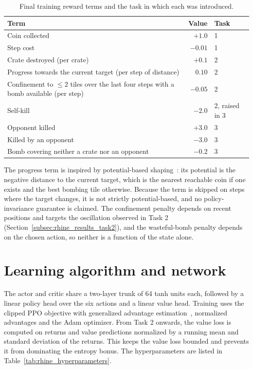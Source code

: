 \documentclass[11pt,a4paper]{report}
\begin{document}
	\begin{table}[htbp]
		\centering
		\small
		\begin{tabular}{lrl}
			\toprule
			Term & Value & Task \\
			\midrule
			Coin collected & $+1.0$ & 1 \\
			Step cost & $-0.01$ & 1 \\
			Crate destroyed (per crate) & $+0.1$ & 2 \\
			Progress towards the current target (per step of distance) & $0.10$ & 2 \\
			Confinement to $\le 2$ tiles over the last four steps with a bomb available (per step) & $-0.05$ & 2 \\
			Self-kill & $-2.0$ & 2, raised in 3 \\
			Opponent killed & $+3.0$ & 3 \\
			Killed by an opponent & $-3.0$ & 3 \\
			Bomb covering neither a crate nor an opponent & $-0.2$ & 3 \\
			\bottomrule
		\end{tabular}
		\caption{Final training reward terms and the task in which each was introduced.}
		\label{tab:rhine_reward}
	\end{table}
	
	The progress term is inspired by potential-based shaping~\cite{ng1999shaping}: its potential is the negative distance to the current target, which is the nearest reachable coin if one exists and the best bombing tile otherwise. Because the term is skipped on steps where the target changes, it is not strictly potential-based, and no policy-invariance guarantee is claimed. The confinement penalty depends on recent positions and targets the oscillation observed in Task 2 (Section~\ref{subsec:rhine_results_task2}), and the wasteful-bomb penalty depends on the chosen action, so neither is a function of the state alone.
	
	\section{Learning algorithm and network}
	\label{subsec:rhine_ppo}
	
	The actor and critic share a two-layer trunk of 64 tanh units each, followed by a linear policy head over the six actions and a linear value head. Training uses the clipped PPO objective with generalized advantage estimation~\cite{schulman2017ppo,schulman2016gae}, normalized advantages and the Adam optimizer. From Task 2 onwards, the value loss is computed on returns and value predictions normalized by a running mean and standard deviation of the returns. This keeps the value loss bounded and prevents it from dominating the entropy bonus. The hyperparameters are listed in Table~\ref{tab:rhine_hyperparameters}.
	
\end{document}
